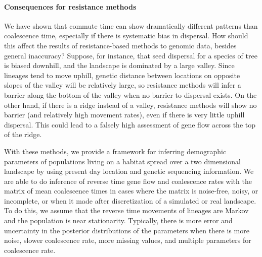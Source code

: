 \documentclass{article}
\begin{document}
\paragraph{Consequences for resistance methods}
We have shown that commute time can show dramatically different patterns
than coalescence time, especially if there is systematic bias in dispersal.
How should this affect the results of resistance-based methods to genomic data,
besides general inaccuracy?
Suppose, for instance, that seed dispersal for a species of tree
is biased downhill,
and the landscape is dominated by a large valley.
Since lineages tend to move uphill,
genetic distance between locations on opposite slopes of the valley will be relatively large,
so resistance methods will infer a barrier along the bottom of the valley
when no barrier to dispersal exists.
On the other hand, if there is a ridge instead of a valley,
resistance methods will show no barrier (and relatively high movement rates),
even if there is very little uphill dispersal.
This could lead to a falsely high assessment of gene flow across the top of the ridge.


With these methods, we provide a framework for
inferring demographic parameters of 
populations living on a habitat spread over a two dimensional landscape 
by using present day location and genetic sequencing information.
We are able to do inference of reverse time gene flow and coalescence rates 
with the matrix of mean coalescence times
in cases where the matrix is noise-free, noisy, or incomplete, 
or when it made after discretization of a simulated or real landscape.
To do this, we assume that the reverse time movements of lineages are Markov
and the population is near stationarity.
Typically, there is more error and uncertainty in the posterior distributions of the parameters
when there is more noise, slower coalescence rate, more missing values,
and multiple parameters for coalescence rate.
\end{document}
